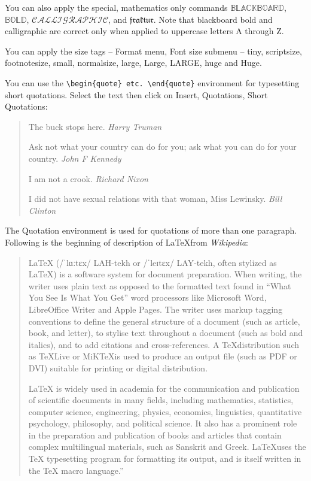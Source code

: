 \documentclass{book}\usepackage{knitr}
\begin{document}
You can also apply the special, mathematics only commands $\mathbb{BLACKBOARD}$, $\mathbb{BOLD}$, $\mathcal{CALLIGRAPHIC}$, and $\mathfrak{fraktur}$. Note that blackboard bold and calligraphic are correct only when applied to uppercase letters A through Z.

You can apply the size tags -- Format menu, Font size submenu -- {\tiny tiny}, {\scriptsize scriptsize}, {\footnotesize footnotesize}, {\small small}, {\normalsize normalsize}, {\large large}, {\Large Large}, {\LARGE LARGE}, {\huge huge} and {\Huge Huge}.

You can use the \verb"\begin{quote} etc. \end{quote}" environment for typesetting short quotations. Select the text then click on Insert, Quotations, Short Quotations:

\begin{quote}
The buck stops here. \emph{Harry Truman}

Ask not what your country can do for you; ask what you can do for your
country. \emph{John F Kennedy}

I am not a crook. \emph{Richard Nixon}

I did not have sexual relations with that woman, Miss Lewinsky. \emph{Bill Clinton}
\end{quote}

The Quotation environment is used for quotations of more than one paragraph. Following is the beginning of description of \LaTeX from \emph{Wikipedia}:

\begin{quotation}
LaTeX (/ˈlɑːtɛx/ LAH-tekh or /ˈleɪtɛx/ LAY-tekh, often stylized as \LaTeX) is a software system for document preparation. When writing, the writer uses plain text as opposed to the formatted text found in ``What You See Is What You Get'' word processors like Microsoft Word, LibreOffice Writer and Apple Pages. The writer uses markup tagging conventions to define the general structure of a document (such as article, book, and letter), to stylise text throughout a document (such as bold and italics), and to add citations and cross-references. A \TeX distribution such as \TeX Live or MiK\TeX is used to produce an output file (such as PDF or DVI) suitable for printing or digital distribution.

LaTeX is widely used in academia for the communication and publication of scientific documents in many fields, including mathematics, statistics, computer science, engineering, physics, economics, linguistics, quantitative psychology, philosophy, and political science. It also has a prominent role in the preparation and publication of books and articles that contain complex multilingual materials, such as Sanskrit and Greek. \LaTeX uses the TeX typesetting program for formatting its output, and is itself written in the TeX macro language.''
\end{quotation}
\end{document}

